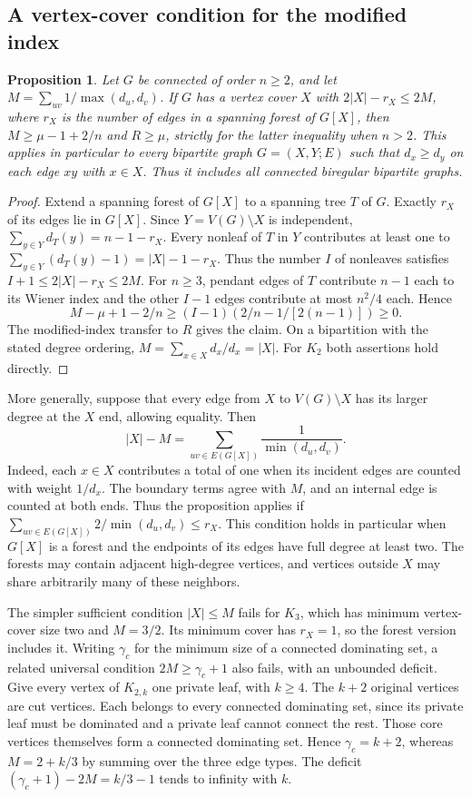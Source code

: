 \documentclass[11pt,a4paper]{article}
\newtheorem{proposition}[theorem]{Proposition}
\begin{document}
\subsection*{A vertex-cover condition for the modified index}
\begin{proposition}\label{p07-prop:fajtcover}
Let $G$ be connected of order $n\ge2$, and let $M=\sum_{uv}1/\max(d_u,d_v)$. If $G$ has a vertex cover $X$ with $2|X|-r_X\le2M$, where $r_X$ is the number of edges in a spanning forest of $G[X]$, then $M\ge\mu-1+2/n$ and $R\ge\mu$, strictly for the latter inequality when $n>2$. This applies in particular to every bipartite graph $G=(X,Y;E)$ such that $d_x\ge d_y$ on each edge $xy$ with $x\in X$. Thus it includes all connected biregular bipartite graphs.
\end{proposition}
\begin{proof}
Extend a spanning forest of $G[X]$ to a spanning tree $T$ of $G$. Exactly $r_X$ of its edges lie in $G[X]$. Since $Y=V(G)\setminus X$ is independent, $\sum_{y\in Y}d_T(y)=n-1-r_X$. Every nonleaf of $T$ in $Y$ contributes at least one to $\sum_{y\in Y}(d_T(y)-1)=|X|-1-r_X$. Thus the number $I$ of nonleaves satisfies $I+1\le 2|X|-r_X\le 2M$. For $n\ge3$, pendant edges of $T$ contribute $n-1$ each to its Wiener index and the other $I-1$ edges contribute at most $n^2/4$ each. Hence
\[
 M-\mu+1-2/n\ge(I-1)\left(2/n-1/[2(n-1)]\right)\ge0.
\]
The modified-index transfer to $R$ gives the claim. On a bipartition with the stated degree ordering, $M=\sum_{x\in X}d_x/d_x=|X|$. For $K_2$ both assertions hold directly.
\end{proof}

More generally, suppose that every edge from $X$ to $V(G)\setminus X$ has its larger degree at the $X$ end, allowing equality. Then
\[
 |X|-M=\sum_{uv\in E(G[X])}\frac1{\min(d_u,d_v)}.
\]
Indeed, each $x\in X$ contributes a total of one when its incident edges are counted with weight $1/d_x$. The boundary terms agree with $M$, and an internal edge is counted at both ends. Thus the proposition applies if $\sum_{uv\in E(G[X])}2/\min(d_u,d_v)\le r_X$. This condition holds in particular when $G[X]$ is a forest and the endpoints of its edges have full degree at least two. The forests may contain adjacent high-degree vertices, and vertices outside $X$ may share arbitrarily many of these neighbors.

The simpler sufficient condition $|X|\le M$ fails for $K_3$, which has minimum vertex-cover size two and $M=3/2$. Its minimum cover has $r_X=1$, so the forest version includes it. Writing $\gamma_c$ for the minimum size of a connected dominating set, a related universal condition $2M\ge\gamma_c+1$ also fails, with an unbounded deficit. Give every vertex of $K_{2,k}$ one private leaf, with $k\ge4$. The $k+2$ original vertices are cut vertices. Each belongs to every connected dominating set, since its private leaf must be dominated and a private leaf cannot connect the rest. Those core vertices themselves form a connected dominating set. Hence $\gamma_c=k+2$, whereas $M=2+k/3$ by summing over the three edge types. The deficit $(\gamma_c+1)-2M=k/3-1$ tends to infinity with $k$.
\end{document}
